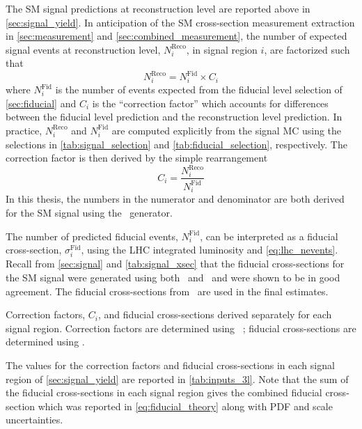 The SM signal predictions at reconstruction level 
are reported above in \sec\ref{sec:signal_yield}.
In anticipation of the SM cross-section measurement extraction
in \sec\ref{sec:measurement} and \sec\ref{sec:combined_measurement}, 
the number of expected signal events 
at reconstruction level, $N^{\textrm{Reco}}_i$, in signal region $i$,
are factorized such that
\begin{equation}
N^{\textrm{Reco}}_i = N^{\textrm{Fid}}_i \times C_i
\end{equation}
where $N^{\textrm{Fid}}_i$
is the number of events expected from the fiducial
level selection of \sec\ref{sec:fiducial} and 
$C_i$ is the ``correction factor'' which 
accounts for differences between the fiducial level prediction
and the reconstruction level prediction.
In practice, $N^{\textrm{Reco}}_i$ and $N^{\textrm{Fid}}_i$
are computed explicitly from the signal MC using the selections
in \tab\ref{tab:signal_selection} and \tab\ref{tab:fiducial_selection},
respectively.  The correction factor is then derived by the simple rearrangement
\begin{equation}
\label{eq:cfactor}
C_i = \frac{N_i^{\textrm{Reco}}}{N_i^{\textrm{Fid}}}
\end{equation}
In this thesis, the numbers in the numerator and denominator are both derived for the SM
signal using the \vbfnlo~generator.


The number of predicted fiducial events, $N^{\textrm{Fid}}_i$,
can be interpreted as a fiducial cross-section, $\sigma^{\textrm{Fid}}_i$,
using the LHC integrated luminosity and \eqn\eqref{eq:lhc_nevents}.
Recall from \sec\ref{sec:signal} and \tab\ref{tab:signal_xsec}
that the fiducial cross-sections for the SM signal were generated using
both \madgraph~and \vbfnlo~and were shown to be in good agreement.
The fiducial cross-sections from \madgraph~are used in the final
estimates.


\begin{table}[ht!]
\centering

\caption{Correction factors, $C_i$, and fiducial cross-sections derived
separately for each signal region. Correction factors are determined
using \vbfnlo~; fiducial cross-sections are determined
using \madgraph.}
\label{tab:inputs_3l}
\end{table}

The values for the correction factors and fiducial cross-sections
in each signal region of \sec\ref{sec:signal_yield}
are reported in \tab\ref{tab:inputs_3l}.
Note that the sum of the fiducial cross-sections
in each signal region gives the combined fiducial cross-section
which was reported in \eqn\ref{eq:fiducial_theory} along with 
PDF and scale uncertainties.



